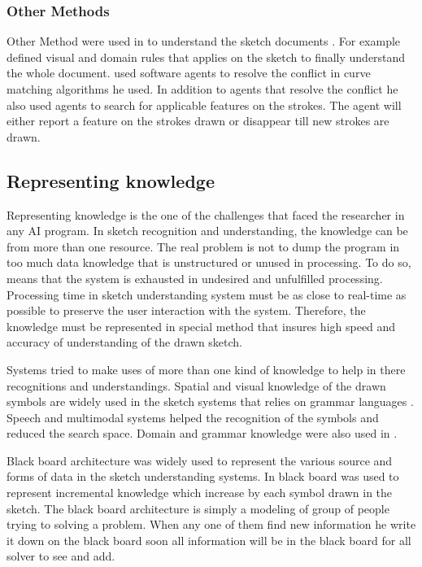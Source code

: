 \subsubsection{Other Methods}
\label{sec:OtherMethods}

Other Method were used in \cite{agent47,sketchinginterfaces2}to understand the sketch documents . For example \cite{sketchinginterfaces2} defined  visual and domain rules that applies on the sketch to finally understand the whole document. \cite{agent47} used software agents to resolve the conflict in curve matching algorithms he used. In addition to agents that resolve the conflict he also used agents to search for applicable features on the strokes. The agent will either report a feature on the strokes drawn or disappear till new strokes are drawn. 

\subsection{Representing knowledge }
\label{sec:Representingknowledge }


Representing knowledge is the one of the challenges that faced the researcher in any AI program. In sketch recognition and understanding, the knowledge can be from more than one resource. The real problem is not to dump the program in too much data knowledge that is unstructured or unused in processing. To do so, means that the system is exhausted in undesired and unfulfilled processing. Processing time in sketch understanding system must be as close to real-time as possible to preserve the user interaction with the system. Therefore, the knowledge must be represented in special method that insures high speed and accuracy of understanding of the drawn sketch.

Systems tried to make uses of more than one kind of knowledge to help in there recognitions and understandings. Spatial and visual knowledge of the drawn symbols are widely used in the sketch systems that relies on grammar languages \cite{GenericHMM28,statisticalparsing26,SketchRead2007} . Speech and multimodal systems helped the recognition of the symbols and reduced the search space.  Domain and grammar knowledge were also used in \cite {geometrydomain49}  .


Black board architecture \cite {blackboardur} was widely used to represent the various source and forms of data in the sketch understanding systems. In \cite {Alvarado2002Framework11}  black board was used to represent incremental knowledge which increase by each symbol drawn in the sketch. The black board architecture is simply a modeling of group of people trying to solving a problem. When any one of them find new information he write it down on the black board soon all information will be in the black board for all solver to see and add.

